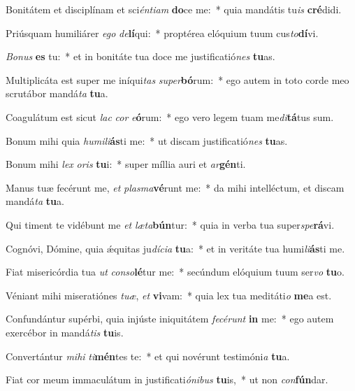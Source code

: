 \item Bonitátem et disciplínam et sci\textit{én}\textit{ti}\textit{am} \textbf{do}ce me:~* quia mandátis tu\textit{is} \textbf{cré}didi.
\item Priúsquam humiliárer \textit{e}\textit{go} \textit{de}\textbf{lí}qui:~* proptérea elóquium tuum cus\textit{to}\textbf{dí}vi.
\item \textit{Bo}\textit{nus} \textbf{es} tu:~* et in bonitáte tua doce me justificatió\textit{nes} \textbf{tu}as.
\item Multiplicáta est super me iníqui\textit{tas} \textit{su}\textit{per}\textbf{bó}rum:~* ego autem in toto corde meo scrutábor mandá\textit{ta} \textbf{tu}a.
\item Coagulátum est sicut \textit{lac} \textit{cor} \textit{e}\textbf{ó}rum:~* ego vero legem tuam me\textit{di}\textbf{tá}tus sum.
\item Bonum mihi quia \textit{hu}\textit{mi}\textit{li}\textbf{ás}ti me:~* ut discam justificatió\textit{nes} \textbf{tu}as.
\item Bonum mihi \textit{lex} \textit{o}\textit{ris} \textbf{tu}i:~* super míllia auri et \textit{ar}\textbf{gén}ti.
\item Manus tuæ fecérunt me, \textit{et} \textit{plas}\textit{ma}\textbf{vé}runt me:~* da mihi intelléctum, et discam mandá\textit{ta} \textbf{tu}a.
\item Qui timent te vidébunt me \textit{et} \textit{læ}\textit{ta}\textbf{bún}tur:~* quia in verba tua super\textit{spe}\textbf{rá}vi.
\item Cognóvi, Dómine, quia ǽquitas ju\textit{dí}\textit{ci}\textit{a} \textbf{tu}a:~* et in veritáte tua humi\textit{li}\textbf{ás}ti me.
\item Fiat misericórdia tua \textit{ut} \textit{con}\textit{so}\textbf{lé}tur me:~* secúndum elóquium tuum ser\textit{vo} \textbf{tu}o.
\item Véniant mihi miseratiónes \textit{tu}\textit{æ}, \textit{et} \textbf{vi}vam:~* quia lex tua meditáti\textit{o} \textbf{me}a est.
\item Confundántur supérbi, quia injúste iniquitátem \textit{fe}\textit{cé}\textit{runt} \textbf{in} me:~* ego autem exercébor in mandá\textit{tis} \textbf{tu}is.
\item Convertántur \textit{mi}\textit{hi} \textit{ti}\textbf{mén}tes te:~* et qui novérunt testimóni\textit{a} \textbf{tu}a.
\item Fiat cor meum immaculátum in justificati\textit{ó}\textit{ni}\textit{bus} \textbf{tu}is,~* ut non \textit{con}\textbf{fún}dar.
